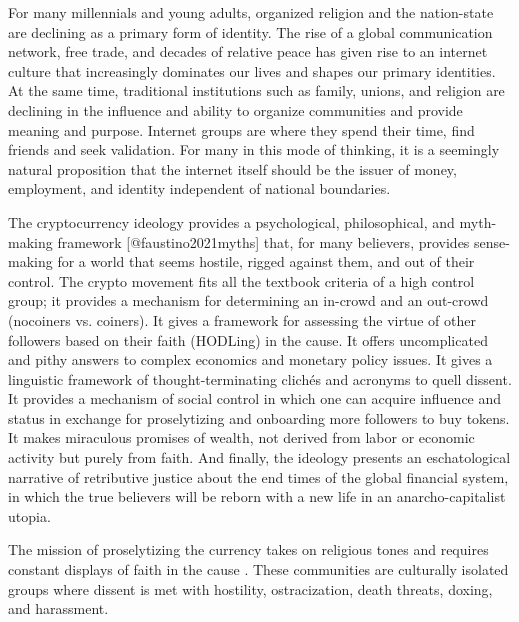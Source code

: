 

For many millennials and young adults, organized religion and the nation-state
are declining as a primary form of identity. The rise of a global communication
network, free trade, and decades of relative peace has given rise to an internet
culture that increasingly dominates our lives and shapes our primary identities.
At the same time, traditional institutions such as family, unions, and religion
are declining in the influence and ability to organize communities and provide
meaning and purpose. Internet groups are where they spend their time, find
friends and seek validation. For many in this mode of thinking, it is a
seemingly natural proposition that the internet itself should be the issuer of
money, employment, and identity independent of national boundaries.

The cryptocurrency ideology provides a psychological, philosophical, and
myth-making framework [@faustino2021myths] that, for many believers, provides
sense-making for a world that seems hostile, rigged against them, and out of
their control. The crypto movement fits all the textbook criteria of a high
control group; it provides a mechanism for determining an in-crowd and an
out-crowd (nocoiners vs. coiners). It gives a framework for assessing the virtue
of other followers based on their faith (HODLing) in the cause. It offers
uncomplicated and pithy answers to complex economics and monetary policy issues.
It gives a linguistic framework of thought-terminating clichés and acronyms to
quell dissent. It provides a mechanism of social control in which one can
acquire influence and status in exchange for proselytizing and onboarding more
followers to buy tokens. It makes miraculous promises of wealth, not derived
from labor or economic activity but purely from faith. And finally, the ideology
presents an eschatological narrative of retributive justice about the end times
of the global financial system, in which the true believers will be reborn with
a new life in an anarcho-capitalist utopia.


The mission of proselytizing the currency takes on religious tones and requires
constant displays of faith in the cause \cite{@golumbia2018zealots}. These
communities are culturally isolated groups where dissent is met with hostility,
ostracization, death threats, doxing, and harassment.

